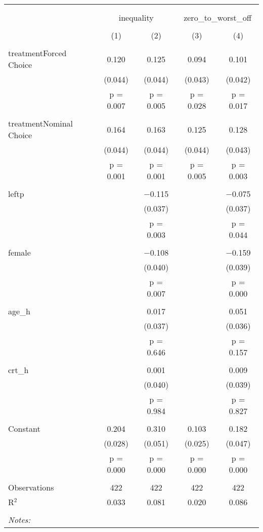
\begin{table}[!htbp] \centering 
  \caption{} 
  \label{tbl:l1} 
\begin{tabular}{@{\extracolsep{5pt}}lcccc} 
\\[-1.8ex]\hline 
\hline \\[-1.8ex] 
\\[-1.8ex] & \multicolumn{2}{c}{inequality} & \multicolumn{2}{c}{zero\_to\_worst\_off} \\ 
\\[-1.8ex] & (1) & (2) & (3) & (4)\\ 
\hline \\[-1.8ex] 
 treatmentForced Choice & 0.120 & 0.125 & 0.094 & 0.101 \\ 
  & (0.044) & (0.044) & (0.043) & (0.042) \\ 
  & p = 0.007 & p = 0.005 & p = 0.028 & p = 0.017 \\ 
  & & & & \\ 
 treatmentNominal Choice & 0.164 & 0.163 & 0.125 & 0.128 \\ 
  & (0.044) & (0.044) & (0.044) & (0.043) \\ 
  & p = 0.001 & p = 0.001 & p = 0.005 & p = 0.003 \\ 
  & & & & \\ 
 leftp &  & $-$0.115 &  & $-$0.075 \\ 
  &  & (0.037) &  & (0.037) \\ 
  &  & p = 0.003 &  & p = 0.044 \\ 
  & & & & \\ 
 female &  & $-$0.108 &  & $-$0.159 \\ 
  &  & (0.040) &  & (0.039) \\ 
  &  & p = 0.007 &  & p = 0.000 \\ 
  & & & & \\ 
 age\_h &  & 0.017 &  & 0.051 \\ 
  &  & (0.037) &  & (0.036) \\ 
  &  & p = 0.646 &  & p = 0.157 \\ 
  & & & & \\ 
 crt\_h &  & 0.001 &  & 0.009 \\ 
  &  & (0.040) &  & (0.039) \\ 
  &  & p = 0.984 &  & p = 0.827 \\ 
  & & & & \\ 
 Constant & 0.204 & 0.310 & 0.103 & 0.182 \\ 
  & (0.028) & (0.051) & (0.025) & (0.047) \\ 
  & p = 0.000 & p = 0.000 & p = 0.000 & p = 0.000 \\ 
  & & & & \\ 
Observations & 422 & 422 & 422 & 422 \\ 
R$^{2}$ & 0.033 & 0.081 & 0.020 & 0.086 \\ 
\hline \\[-1.8ex] 
\textit{Notes:} & \multicolumn{4}{l}{} \\ 
\end{tabular} 
\end{table}  
